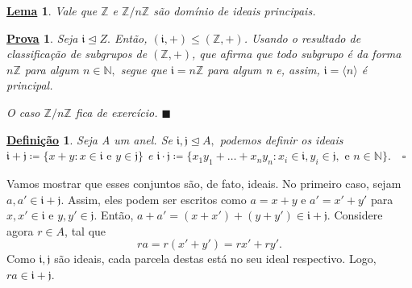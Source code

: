 \documentclass{article}
\newtheorem*{def*}{\underline{Defini\c c\~ao}}
\newtheorem*{lemma*}{\underline{Lema}}
\newtheorem*{proof*}{\underline{Prova}}
\renewcommand\qedsymbol{$\blacksquare$}
\begin{document}
\begin{lemma*}
  Vale que \(\mathbb{Z}\) e \(\mathbb{Z}/n \mathbb{Z}\) são domínio de ideais principais.
\end{lemma*}
\begin{proof*}
  Seja \(\mathfrak{i} \trianglelefteq{Z}.\) Então, \((\mathfrak{i}, +)\leq (\mathbb{Z}, +)\). Usando o resultado
de classificação de subgrupos de \((\mathbb{Z}, +)\), que afirma que todo subgrupo é da forma \(n \mathbb{Z}\) para
algum \(n\in \mathbb{N},\) segue que \(\mathfrak{i} = n \mathbb{Z}\) para algum n e, assim, \(\mathfrak{i} = \langle n \rangle\) 
é principal.

  O caso \(\mathbb{Z}/n \mathbb{Z}\) fica de exercício. \qedsymbol
\end{proof*}
\begin{def*}
  Seja A um anel. Se \(\mathfrak{i}, \mathfrak{j} \trianglelefteq{A},\) podemos definir os ideais \(\mathfrak{i} + \mathfrak{j}\coloneqq \{x+y:x\in \mathfrak{i}\text{ e } y\in \mathfrak{j}\}\)
e \(\mathfrak{i} \cdot \mathfrak{j}\coloneqq \{x_{1}y_{1}+\dotsc+x_{n}y_{n}: x_{i}\in \mathfrak{i}, y_{i}\in \mathfrak{j}, \text{ e } n\in \mathbb{N}\}.\quad\square\)
\end{def*}
  Vamos mostrar que esses conjuntos são, de fato, ideais. No primeiro caso, sejam \(a, a'\in \mathfrak{i} + \mathfrak{j}.\)
Assim, eles podem ser escritos como \(a = x + y\) e \(a'= x'+ y'\) para \(x, x'\in \mathfrak{i}\) e \(y, y'\in \mathfrak{j}.\)
Então, \(a + a' = (x + x') + (y + y')\in \mathfrak{i} + \mathfrak{j}.\) Considere agora \(r\in A\), tal que 
  \[
    ra = r(x'+y') = rx' + ry'.
  \]
  Como \(\mathfrak{i}, \mathfrak{j}\) são ideais, cada parcela destas está no seu ideal respectivo.
Logo, \(ra \in \mathfrak{i} + \mathfrak{j}.\)
\end{document}
